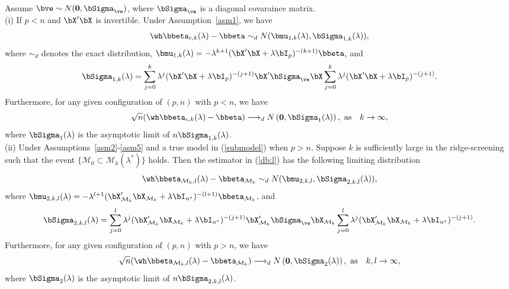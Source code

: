 \begin{theorem}\label{thm6}Assume $\bve\sim N({\bf 0},\bSigma_\ve)$, where $\bSigma_\ve$ is a diagonal covaraince matrix.\\
(i) If $p<n$ and $\bX'\bX$ is invertible. Under Assumption~\ref{asm1}, we have
\[\wh\bbeta_{c,k}(\lambda)-\bbeta\sim_d N(\bmu_{1,k}(\lambda),\bSigma_{1,k}(\lambda)),\]
where $\sim_d$ denotes the exact distribution, 
$\bmu_{1,k}(\lambda)=-\lambda^{k+1}(\bX'\bX+\lambda\bI_p)^{-(k+1)}\bbeta$,
and
\[\bSigma_{1,k}(\lambda)=\sum_{j=0}^k \lambda^j(\bX'\bX+\lambda\bI_p)^{-(j+1)}\bX'\bSigma_\ve\bX\sum_{j=0}^k \lambda^j(\bX'\bX+\lambda\bI_p)^{-(j+1)}.\]
Furthermore, for any given  configuration of $(p,n)$ with $p<n$, we have
\[\sqrt{n}(\wh\bbeta_{c,k}(\lambda)-\bbeta)\longrightarrow_d N\left({\bf 0},\bSigma_{1}(\lambda)\right),\,\,\text{as}\quad k\rightarrow\infty,\]
where $\bSigma_1(\lambda)$ is the asymptotic limit of $n\bSigma_{1,k}(\lambda)$.\\
(ii) Under Assumptions~\ref{asm2}-\ref{asm5} and a true model in (\ref{submodel}) when $p>n$. Suppose $k$ is sufficiently large in the ridge-screening such that the event $\{\mathcal{M}_0\subset \mathcal{M}_{k}(\lambda^*)\}$ holds. Then the estimator in (\ref{db:l}) has the following limiting distribution
\[\wh\bbeta_{\mathcal{M}_k,l}(\lambda)-\bbeta_{\mathcal{M}_k}\sim_d N(\bmu_{2,k,l},\bSigma_{2,k,l}(\lambda)),\]
where $\bmu_{2,k,l}(\lambda)=-\lambda^{l+1}(\bX_{\mathcal{M}_k}'\bX_{\mathcal{M}_k}+\lambda\bI_{n^*})^{-(l+1)}\bbeta_{\mathcal{M}_k}$,
and
\[\bSigma_{2,k,l}(\lambda)=\sum_{j=0}^l \lambda^j(\bX_{\mathcal{M}_k}'\bX_{\mathcal{M}_k}+\lambda\bI_{n^*})^{-(j+1)}\bX_{\mathcal{M}_k}'\bSigma_\ve\bX_{\mathcal{M}_k}\sum_{j=0}^l \lambda^j(\bX_{\mathcal{M}_k}'\bX_{\mathcal{M}_k}+\lambda\bI_{n^*})^{-(j+1)}.\]
Furthermore, for any given  configuration of $(p,n)$ with $p> n$, we have
\[\sqrt{n}(\wh\bbeta_{\mathcal{M}_k,l}(\lambda)-\bbeta_{\mathcal{M}_k})\longrightarrow_d N\left({\bf 0},\bSigma_{2}(\lambda)\right),\,\,\text{as}\quad k,l\rightarrow\infty,\]
where $\bSigma_2(\lambda)$ is the asymptotic limit of $n\bSigma_{2,k,l}(\lambda)$.\\
\end{theorem}

